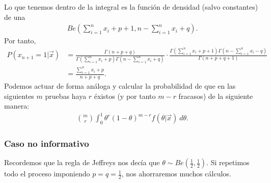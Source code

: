 Lo que tenemos dentro de la integral es la función de densidad (salvo constantes) de una
\begin{align*}
    Be\left( \sum_{i=1}^{n} x_i + p + 1, n - \sum_{i=1}^{n} x_i + q \right).
\end{align*}
Por tanto,
\begin{align*}
    P(x_{n+1} = 1 | \vec{x}) & = \frac{\Gamma(n+p+q)}{\Gamma(\sum_{i=1}^{n} x_i + p)\Gamma(n-\sum_{i=1}^{n} x_i +q)} \cdot \frac{\Gamma(\sum_{i=1}^{n} x_i + p + 1)\Gamma(n -\sum_{i=1}^{n} x_i -q)}{\Gamma(n+p+q+1)} \\
                             & = \frac{\sum_{i=1}^{n} x_i + p}{n+p+q}.
\end{align*}
Podemos actuar de forma análoga y calcular la probabilidad de que en las siguientes $m$ pruebas haya $r$ éxistos (y por tanto $m-r$ fracasos) de la siguiente manera:
\begin{align*}
    \binom{m}{r} \int_{0}^{1} \theta^r(1 - \theta)^{m-r} f(\theta | \vec{x}) \ d\theta.
\end{align*}

\subsubsection{Caso no informativo}
Recordemos que la regla de Jeffreys nos decía que $\theta \sim Be\left( \frac{1}{2}, \frac{1}{2}\right)$. Si repetimos todo el proceso imponiendo $p = q = \frac{1}{2}$, nos ahorraremos muchos cálculos.

